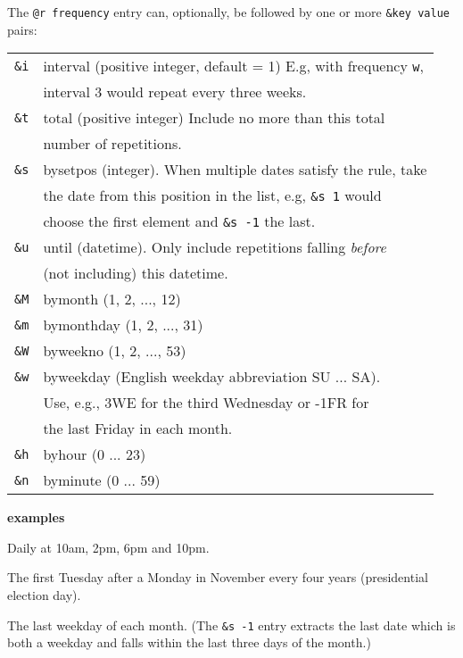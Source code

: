 \documentclass[9pt,landscape]{article}
\begin{document}
\begin{multicols}{3}
\vskip 3pt
The \verb!@r frequency! entry can, optionally, be followed by one or more
\verb!&key value! pairs:
\vskip 3pt

\begin{tabular}{@{}ll@{}}
\texttt{\&i} & interval (positive integer, default = 1) E.g, with frequency \verb!w!, \\
             & interval 3 would repeat every three weeks. \\
\texttt{\&t} & total (positive integer) Include no more than this total \\
             & number of repetitions. \\
\texttt{\&s} & bysetpos (integer). When multiple dates satisfy the rule, take \\
             & the date from this position in the list, e.g, \verb!&s 1! would\\
             & choose the first element and \verb!&s -1! the last. \\
\texttt{\&u} & until (datetime). Only include repetitions falling \emph{before} \\
             & (not including) this datetime. \\
\texttt{\&M} & bymonth (1, 2, ..., 12) \\
\texttt{\&m} & bymonthday (1, 2, ..., 31) \\
\texttt{\&W} & byweekno (1, 2, ..., 53) \\
\texttt{\&w} & byweekday (English weekday abbreviation SU ... SA). \\
             & Use, e.g., 3WE for the third Wednesday or -1FR for \\
             & the last Friday in each month. \\
\texttt{\&h} & byhour (0 ... 23) \\
\texttt{\&n} & byminute (0 ... 59) \\
\end{tabular}

\vskip 4pt
\textbf{examples}
\vskip 3pt

\begin{compactdesc}
  \item[\texttt{@r d \&h 10, 14 18, 22}:]
    Daily at 10am, 2pm, 6pm and 10pm.
  \item[\texttt{@r y \&i 4 \&M 11 \&m range(2,9) \&w TU}:]
    The first Tuesday after a Monday in November every four years (presidential election day).
  \item[\texttt{@r m \&w MO, TU, WE, TH, FR \&m -1, -2, -3 \&s -1}:]
    The last weekday of each month. (The \verb!&s -1! entry extracts the last date which is both a weekday and falls within the last three days of the month.)
\end{compactdesc}


\end{multicols}
\end{document}
